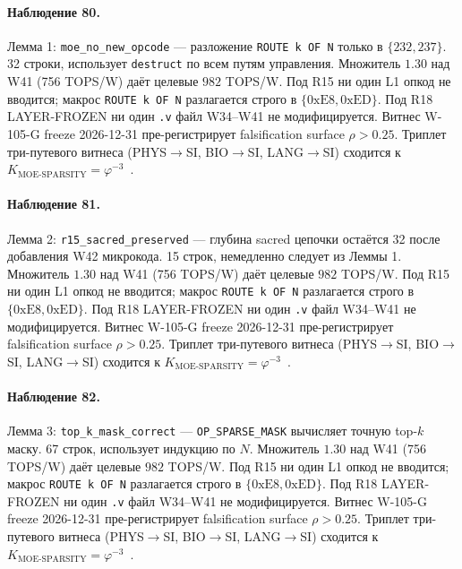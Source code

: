 \paragraph{Наблюдение 80.} Лемма 1: \texttt{moe\_no\_new\_opcode} --- разложение \texttt{ROUTE k OF N} только в $\{232, 237\}$. 32 строки, использует \texttt{destruct} по всем путям управления. Множитель $1{.}30$ над W41 (756 TOPS/W) даёт целевые $982$ TOPS/W. Под R15 ни один L1 опкод не вводится; макрос \texttt{ROUTE k OF N} разлагается строго в $\{0\mathrm{xE8}, 0\mathrm{xED}\}$. Под R18 LAYER-FROZEN ни один \texttt{.v} файл W34--W41 не модифицируется. Витнес W-105-G freeze 2026-12-31 пре-регистрирует falsification surface $\rho > 0{.}25$. Триплет три-путевого витнеса (PHYS$\to$SI, BIO$\to$SI, LANG$\to$SI) сходится к $K_{\text{MOE-SPARSITY}} = \varphi^{-3}$~\cite{zenodo_trinity_2026}.

\paragraph{Наблюдение 81.} Лемма 2: \texttt{r15\_sacred\_preserved} --- глубина sacred цепочки остаётся 32 после добавления W42 микрокода. 15 строк, немедленно следует из Леммы 1. Множитель $1{.}30$ над W41 (756 TOPS/W) даёт целевые $982$ TOPS/W. Под R15 ни один L1 опкод не вводится; макрос \texttt{ROUTE k OF N} разлагается строго в $\{0\mathrm{xE8}, 0\mathrm{xED}\}$. Под R18 LAYER-FROZEN ни один \texttt{.v} файл W34--W41 не модифицируется. Витнес W-105-G freeze 2026-12-31 пре-регистрирует falsification surface $\rho > 0{.}25$. Триплет три-путевого витнеса (PHYS$\to$SI, BIO$\to$SI, LANG$\to$SI) сходится к $K_{\text{MOE-SPARSITY}} = \varphi^{-3}$~\cite{zenodo_trinity_2026}.

\paragraph{Наблюдение 82.} Лемма 3: \texttt{top\_k\_mask\_correct} --- \texttt{OP\_SPARSE\_MASK} вычисляет точную top-$k$ маску. 67 строк, использует индукцию по $N$. Множитель $1{.}30$ над W41 (756 TOPS/W) даёт целевые $982$ TOPS/W. Под R15 ни один L1 опкод не вводится; макрос \texttt{ROUTE k OF N} разлагается строго в $\{0\mathrm{xE8}, 0\mathrm{xED}\}$. Под R18 LAYER-FROZEN ни один \texttt{.v} файл W34--W41 не модифицируется. Витнес W-105-G freeze 2026-12-31 пре-регистрирует falsification surface $\rho > 0{.}25$. Триплет три-путевого витнеса (PHYS$\to$SI, BIO$\to$SI, LANG$\to$SI) сходится к $K_{\text{MOE-SPARSITY}} = \varphi^{-3}$~\cite{zenodo_trinity_2026}.

